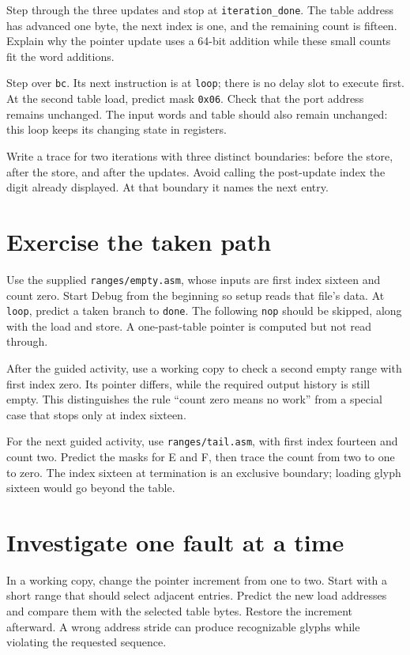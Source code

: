 Step through the three updates and stop at \texttt{iteration\_done}. The table
address has advanced one byte, the next index is one, and the remaining count is
fifteen. Explain why the pointer update uses a 64-bit addition while these small
counts fit the word additions.

Step over \texttt{bc}. Its next instruction is at \texttt{loop}; there is no delay
slot to execute first. At the second table load, predict mask \texttt{0x06}.
Check that the port address remains unchanged. The input words and table should
also remain unchanged: this loop keeps its changing state in registers.

Write a trace for two iterations with three distinct boundaries: before the
store, after the store, and after the updates. Avoid calling the post-update index
the digit already displayed. At that boundary it names the next entry.

\section{Exercise the taken path}

Use the supplied \texttt{ranges/empty.asm}, whose inputs are first index sixteen
and count zero. Start Debug from the beginning so setup reads that file's data. At \texttt{loop}, predict a taken branch
to \texttt{done}. The following \texttt{nop} should be skipped, along with the
load and store. A one-past-table pointer is computed but not read through.

After the guided activity, use a working copy to check a second empty range with
first index zero. Its pointer differs, while the required output history is
still empty. This distinguishes the rule ``count zero
means no work'' from a special case that stops only at index sixteen.

For the next guided activity, use \texttt{ranges/tail.asm}, with first index fourteen and count two. Predict the masks for E and F,
then trace the count from two to one to zero. The index sixteen at termination
is an exclusive boundary; loading glyph sixteen would go beyond the table.

\section{Investigate one fault at a time}

In a working copy, change the pointer increment from one to two. Start with a
short range that should select adjacent entries. Predict the new load addresses
and compare them with the selected table bytes. Restore the increment afterward.
A wrong address stride can produce recognizable glyphs while violating the
requested sequence.

